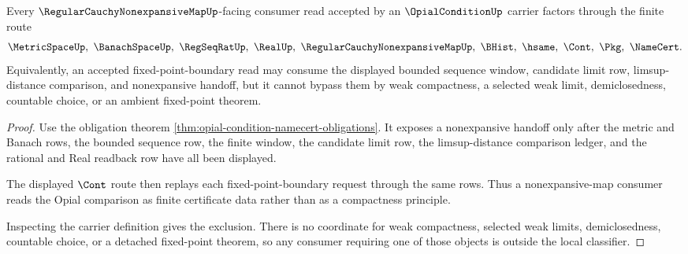 \begin{theorem}
\label{thm:opial-condition-nonexpansive-handoff}
Every $\RegularCauchyNonexpansiveMapUp$-facing consumer read accepted by an $\OpialConditionUp$ carrier factors through the finite route
$$
\MetricSpaceUp,\ \BanachSpaceUp,\ \RegSeqRatUp,\ \RealUp,\ \RegularCauchyNonexpansiveMapUp,\ \BHist,\ \hsame,\ \Cont,\ \Pkg,\ \NameCert .
$$
Equivalently, an accepted fixed-point-boundary read may consume the displayed bounded sequence window, candidate limit row, limsup-distance comparison, and nonexpansive handoff, but it cannot bypass them by weak compactness, a selected weak limit, demiclosedness, countable choice, or an ambient fixed-point theorem.
\end{theorem}
\begin{proof}
Use the obligation theorem \autoref{thm:opial-condition-namecert-obligations}. It exposes a nonexpansive handoff only after the metric and Banach rows, the bounded sequence row, the finite window, the candidate limit row, the limsup-distance comparison ledger, and the rational and Real readback row have all been displayed.

The displayed $\Cont$ route then replays each fixed-point-boundary request through the same rows. Thus a nonexpansive-map consumer reads the Opial comparison as finite certificate data rather than as a compactness principle.

Inspecting the carrier definition gives the exclusion. There is no coordinate for weak compactness, selected weak limits, demiclosedness, countable choice, or a detached fixed-point theorem, so any consumer requiring one of those objects is outside the local classifier.
\end{proof}


\begin{closurestatus}{\OpialConditionUp}
  \theoryclosure{\seedClosure}
  \formalstatus{\unformalizedV}
\end{closurestatus}
